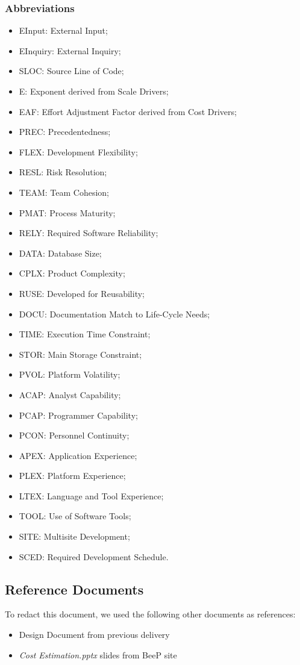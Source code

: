 	\subsubsection{Abbreviations}
		\begin{itemize}
			\item EInput: External Input;
			\item EInquiry: External Inquiry;
			\item SLOC: Source Line of Code;
			\item E: Exponent derived from Scale Drivers;
			\item EAF: Effort Adjustment Factor derived from Cost Drivers;
			\item PREC: Precedentedness;
			\item FLEX: Development Flexibility;
			\item RESL: Risk Resolution;
			\item TEAM: Team Cohesion;
			\item PMAT: Process Maturity;
			\item RELY: Required Software Reliability;
			\item DATA: Database Size;
			\item CPLX: Product Complexity;
			\item RUSE: Developed for Reusability;
			\item DOCU: Documentation Match to Life-Cycle Needs;
			\item TIME: Execution Time Constraint;
			\item STOR: Main Storage Constraint;
			\item PVOL: Platform Volatility;
			\item ACAP: Analyst Capability;
			\item PCAP: Programmer Capability;
			\item PCON: Personnel Continuity;
			\item APEX: Application Experience;
			\item PLEX: Platform Experience;
			\item LTEX: Language and Tool Experience;
			\item TOOL: Use of Software Tools;
			\item SITE: Multisite Development;
			\item SCED: Required Development Schedule.
		\end{itemize}
\subsection{Reference Documents}
	To redact this document, we used the following other documents as references:
	\begin{itemize}
		\item Design Document from previous delivery
		\item \emph{Cost Estimation.pptx} slides from BeeP site
	\end{itemize}